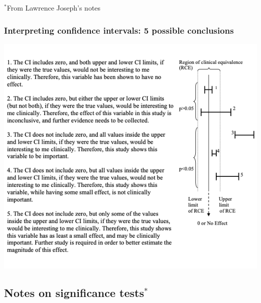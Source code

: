 \documentclass[
]{book}
\begin{document}
\(^*\)From Lawrence Joseph's notes

\hypertarget{interpreting-confidence-intervals-5-possible-conclusions}{%
\subsubsection{Interpreting confidence intervals: 5 possible conclusions}\label{interpreting-confidence-intervals-5-possible-conclusions}}

\includegraphics[width=0.5\linewidth]{./4_48}

\hypertarget{notes-on-significance-tests}{%
\subsection{\texorpdfstring{Notes on significance tests\(^*\)}{Notes on significance tests\^{}*}}\label{notes-on-significance-tests}}
\end{document}
